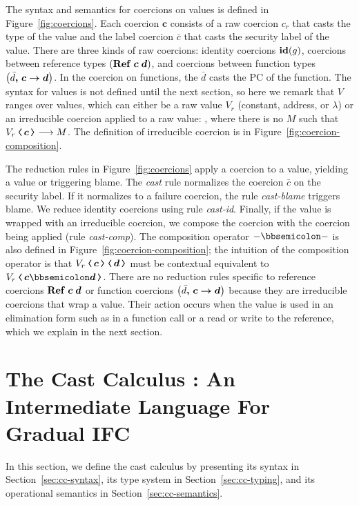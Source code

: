 The syntax and semantics for coercions on values is defined in
Figure~\ref{fig:coercions}. Each coercion $\bm{c}$ consists of a raw coercion
$c_r$ that casts the type of the value and the label coercion $\bar{c}$ that
casts the security label of the value. There are three kinds of raw coercions:
identity coercions $\mathit{\mathbf{id}}(g)$, coercions between reference types
$(\mathbf{Ref}\;{\bm{c}}\;{\bm{d}})$, and coercions between function types $\left(
{\bar{d}}\boldsymbol{,}\,{\bm{c}}\boldsymbol{\rightarrow}{\bm{d}} \right)$. In the coercion on functions, the
$\bar{d}$ casts the PC of the function.
%
The syntax for values is not defined until the next section, so here we remark
that $V$ ranges over values, which can either be a raw value $V_r$ (constant,
address, or $\lambda$) or an irreducible coercion applied to a raw value:
, where there is no $M$ such that $\cccast{V_r}{\bm{c}}
\longrightarrow M$. The definition of irreducible coercion is in
Figure~\ref{fig:coercion-composition}.

The reduction rules in Figure~\ref{fig:coercions} apply a coercion to a value,
yielding a value or triggering blame. The \textit{cast} rule normalizes the
coercion $\bar{c}$ on the security label. If it normalizes to a failure
coercion, the rule \textit{cast-blame} triggers blame. We reduce identity
coercions using rule \textit{cast-id}. Finally, if the value is wrapped with an
irreducible coercion, we compose the coercion with the coercion being applied
(rule \textit{cast-comp}). The composition operator ${-}\mdoubleplus{-}$ is also
defined in Figure~\ref{fig:coercion-composition}; the intuition of the
composition operator is that $\cccast{\cccast{V_r}{\bm{c}}}{\bm{d}}$ must be
contextual equivalent to $\cccast{V_r}{\bm{c} \mdoubleplus \bm{d}}$. There are
no reduction rules specific to reference coercions $\mathbf{Ref}\;{\bm{c}}\;{\bm{d}}$ or
function coercions $\left( {\bar{d}}\boldsymbol{,}\,{\bm{c}}\boldsymbol{\rightarrow}{\bm{d}} \right)$ because they
are irreducible coercions that wrap a value. Their action occurs when the value
is used in an elimination form such as in a function call or a read or write to
the reference, which we explain in the next section.

\section{The Cast Calculus \CC: An Intermediate Language For Gradual IFC}
\label{sec:cc}

In this section, we define the cast calculus \CC by presenting its syntax in
Section~\ref{sec:cc-syntax}, its type system in Section~\ref{sec:cc-typing}, and
its operational semantics in Section~\ref{sec:cc-semantics}.

